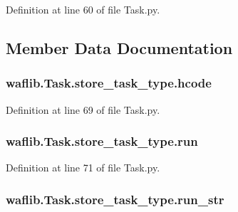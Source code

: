 Definition at line 60 of file Task.\+py.



\subsection{Member Data Documentation}
\subsubsection[{\texorpdfstring{hcode}{hcode}}]{\setlength{\rightskip}{0pt plus 5cm}waflib.\+Task.\+store\+\_\+task\+\_\+type.\+hcode}\hypertarget{classwaflib_1_1_task_1_1store__task__type_a33e96f456bf21f80a3848f2126aec13e}{}\label{classwaflib_1_1_task_1_1store__task__type_a33e96f456bf21f80a3848f2126aec13e}


Definition at line 69 of file Task.\+py.

\subsubsection[{\texorpdfstring{run}{run}}]{\setlength{\rightskip}{0pt plus 5cm}waflib.\+Task.\+store\+\_\+task\+\_\+type.\+run}\hypertarget{classwaflib_1_1_task_1_1store__task__type_a64deaa626baefc72d3317209a3f792e5}{}\label{classwaflib_1_1_task_1_1store__task__type_a64deaa626baefc72d3317209a3f792e5}


Definition at line 71 of file Task.\+py.

\subsubsection[{\texorpdfstring{run\+\_\+str}{run_str}}]{\setlength{\rightskip}{0pt plus 5cm}waflib.\+Task.\+store\+\_\+task\+\_\+type.\+run\+\_\+str}\hypertarget{classwaflib_1_1_task_1_1store__task__type_abbe21e83b454614e56a6be30b06e7cf3}{}\label{classwaflib_1_1_task_1_1store__task__type_abbe21e83b454614e56a6be30b06e7cf3}


